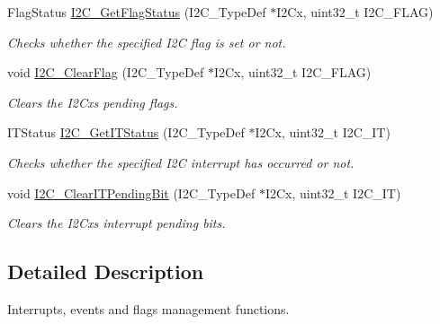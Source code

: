 \begin{DoxyCompactItemize}
Flag\+Status \mbox{\hyperlink{group___i2_c___group5_ga15c95d0ed124f029621a2061b1677ee7}{I2\+C\+\_\+\+Get\+Flag\+Status}} (I2\+C\+\_\+\+Type\+Def $\ast$I2\+Cx, uint32\+\_\+t I2\+C\+\_\+\+F\+L\+AG)
\begin{DoxyCompactList}\small\item\em Checks whether the specified I2C flag is set or not. \end{DoxyCompactList}\item 
void \mbox{\hyperlink{group___i2_c___group5_ga9d4f8fe9f7232696114b5578b1223963}{I2\+C\+\_\+\+Clear\+Flag}} (I2\+C\+\_\+\+Type\+Def $\ast$I2\+Cx, uint32\+\_\+t I2\+C\+\_\+\+F\+L\+AG)
\begin{DoxyCompactList}\small\item\em Clears the I2\+Cx\textquotesingle{}s pending flags. \end{DoxyCompactList}\item 
I\+T\+Status \mbox{\hyperlink{group___i2_c___group5_ga447771fbbd94a56f3570b9f430a069ba}{I2\+C\+\_\+\+Get\+I\+T\+Status}} (I2\+C\+\_\+\+Type\+Def $\ast$I2\+Cx, uint32\+\_\+t I2\+C\+\_\+\+IT)
\begin{DoxyCompactList}\small\item\em Checks whether the specified I2C interrupt has occurred or not. \end{DoxyCompactList}\item 
void \mbox{\hyperlink{group___i2_c___group5_ga110dda440fa200b5f77349df19b3e6bb}{I2\+C\+\_\+\+Clear\+I\+T\+Pending\+Bit}} (I2\+C\+\_\+\+Type\+Def $\ast$I2\+Cx, uint32\+\_\+t I2\+C\+\_\+\+IT)
\begin{DoxyCompactList}\small\item\em Clears the I2\+Cx\textquotesingle{}s interrupt pending bits. \end{DoxyCompactList}\end{DoxyCompactItemize}


\subsection{Detailed Description}
Interrupts, events and flags management functions. 

